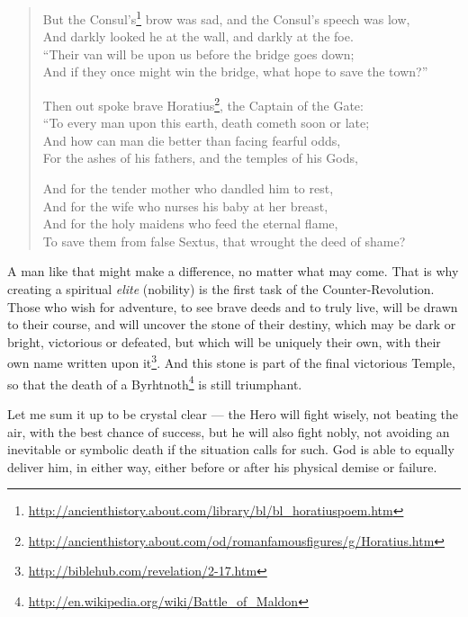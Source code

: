\begin{quotex}
\begin{verse}
But the Consul's\footnote{\url{http://ancienthistory.about.com/library/bl/bl\_horatiuspoem.htm}} brow was sad, and the Consul's speech was low,\\
And darkly looked he at the wall, and darkly at the foe.\\
``Their van will be upon us before the bridge goes down;\\
And if they once might win the bridge, what hope to save the town?''

Then out spoke brave Horatius\footnote{\url{http://ancienthistory.about.com/od/romanfamousfigures/g/Horatius.htm}}, the Captain of the Gate:\\
``To every man upon this earth, death cometh soon or late;\\
And how can man die better than facing fearful odds,\\
For the ashes of his fathers, and the temples of his Gods,

And for the tender mother who dandled him to rest,\\
And for the wife who nurses his baby at her breast,\\
And for the holy maidens who feed the eternal flame,\\
To save them from false Sextus, that wrought the deed of shame?
\end{verse}
\end{quotex}


A man like that might make a difference, no matter what may come. That is why creating a spiritual \emph{elite} (nobility) is the first task of the Counter-Revolution. Those who wish for adventure, to see brave deeds and to truly live, will be drawn to their course, and will uncover the stone of their destiny, which may be dark or bright, victorious or defeated, but which will be uniquely their own, with their own name written upon it\footnote{\url{http://biblehub.com/revelation/2-17.htm}}. And this stone is part of the final victorious Temple, so that the death of a Byrhtnoth\footnote{\url{http://en.wikipedia.org/wiki/Battle\_of\_Maldon}} is still triumphant.

Let me sum it up to be crystal clear --- the Hero will fight wisely, not beating the air, with the best chance of success, but he will also fight nobly, not avoiding an inevitable or symbolic death if the situation calls for such. God is able to equally deliver him, in either way, either before or after his physical demise or failure.

